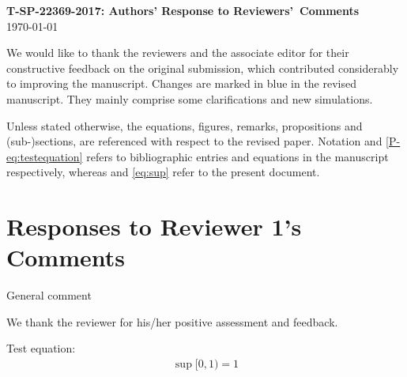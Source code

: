 \documentclass[11pt]{article}
\begin{document}
\begin{center}
    \Large \textbf{T-SP-22369-2017: Authors' Response to Reviewers'~Comments}\\
    \today
\end{center}

We would like to thank the reviewers and the associate editor for
their constructive feedback on the original submission, which
contributed considerably to improving the manuscript. Changes are
marked in {\color{blue}blue} in the revised manuscript. They mainly
comprise some clarifications and new simulations.


\noindent Unless stated otherwise, the equations, figures, remarks,
propositions and (sub-)sections, are referenced with respect to the
revised paper. Notation \cite{P-kay1}
and \eqref{P-eq:testequation} refers to bibliographic entries and equations in
the manuscript respectively, whereas \cite{kay2} and \eqref{eq:sup}
refer to the present document.

\section*{Responses to Reviewer 1's Comments}
\begin{rcomment}
    General comment
\end{rcomment}

\vspace*{0.5em} \noindent
\begin{response}
    We thank the reviewer for his/her positive assessment and feedback.

    Test equation:
    \begin{align}
        \label{eq:sup}
        \sup[0,1) = 1
    \end{align}

\end{response}
\end{document}
